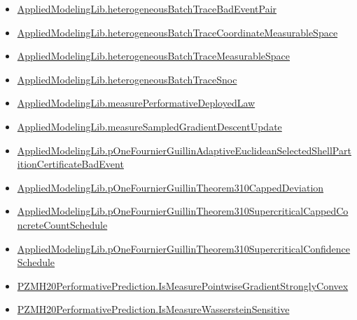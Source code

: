 \documentclass[10pt]{article}
\begin{document}
\begin{itemize}
\item \hyperlink{governing-declaration-68ef005103543934}{Applied\allowbreak{}Modeling\allowbreak{}Lib.\allowbreak{}heterogeneous\allowbreak{}Batch\allowbreak{}Trace\allowbreak{}Bad\allowbreak{}Event\allowbreak{}Pair}
\item \hyperlink{governing-declaration-92d1582063c434f3}{Applied\allowbreak{}Modeling\allowbreak{}Lib.\allowbreak{}heterogeneous\allowbreak{}Batch\allowbreak{}Trace\allowbreak{}Coordinate\allowbreak{}Measurable\allowbreak{}Space}
\item \hyperlink{governing-declaration-caf4e7d2e1526646}{Applied\allowbreak{}Modeling\allowbreak{}Lib.\allowbreak{}heterogeneous\allowbreak{}Batch\allowbreak{}Trace\allowbreak{}Measurable\allowbreak{}Space}
\item \hyperlink{governing-declaration-73f8e033eb247305}{Applied\allowbreak{}Modeling\allowbreak{}Lib.\allowbreak{}heterogeneous\allowbreak{}Batch\allowbreak{}Trace\allowbreak{}Snoc}
\item \hyperlink{governing-declaration-7bc25db7b9b1aaf4}{Applied\allowbreak{}Modeling\allowbreak{}Lib.\allowbreak{}measure\allowbreak{}Performative\allowbreak{}Deployed\allowbreak{}Law}
\item \hyperlink{governing-declaration-46a8b190a3977782}{Applied\allowbreak{}Modeling\allowbreak{}Lib.\allowbreak{}measure\allowbreak{}Sampled\allowbreak{}Gradient\allowbreak{}Descent\allowbreak{}Update}
\item \hyperlink{governing-declaration-30e7d69ebe63768c}{Applied\allowbreak{}Modeling\allowbreak{}Lib.\allowbreak{}p\allowbreak{}One\allowbreak{}Fournier\allowbreak{}Guillin\allowbreak{}Adaptive\allowbreak{}Euclidean\allowbreak{}Selected\allowbreak{}Shell\allowbreak{}Partition\allowbreak{}Certificate\allowbreak{}Bad\allowbreak{}Event}
\item \hyperlink{governing-declaration-25a90c9551dbd2b1}{Applied\allowbreak{}Modeling\allowbreak{}Lib.\allowbreak{}p\allowbreak{}One\allowbreak{}Fournier\allowbreak{}Guillin\allowbreak{}Theorem310\allowbreak{}Capped\allowbreak{}Deviation}
\item \hyperlink{governing-declaration-3cf6b14c7bcca80c}{Applied\allowbreak{}Modeling\allowbreak{}Lib.\allowbreak{}p\allowbreak{}One\allowbreak{}Fournier\allowbreak{}Guillin\allowbreak{}Theorem310\allowbreak{}Supercritical\allowbreak{}Capped\allowbreak{}Concrete\allowbreak{}Count\allowbreak{}Schedule}
\item \hyperlink{governing-declaration-6a2f3c5b322d78da}{Applied\allowbreak{}Modeling\allowbreak{}Lib.\allowbreak{}p\allowbreak{}One\allowbreak{}Fournier\allowbreak{}Guillin\allowbreak{}Theorem310\allowbreak{}Supercritical\allowbreak{}Confidence\allowbreak{}Schedule}
\item \hyperlink{governing-declaration-11c9ab6e3c6f528b}{PZMH20\allowbreak{}Performative\allowbreak{}Prediction.\allowbreak{}Is\allowbreak{}Measure\allowbreak{}Pointwise\allowbreak{}Gradient\allowbreak{}Strongly\allowbreak{}Convex}
\item \hyperlink{paper-prerequisite-2ea2f5769822c5c4}{PZMH20\allowbreak{}Performative\allowbreak{}Prediction.\allowbreak{}Is\allowbreak{}Measure\allowbreak{}Wasserstein\allowbreak{}Sensitive}
\end{itemize}
\end{document}
